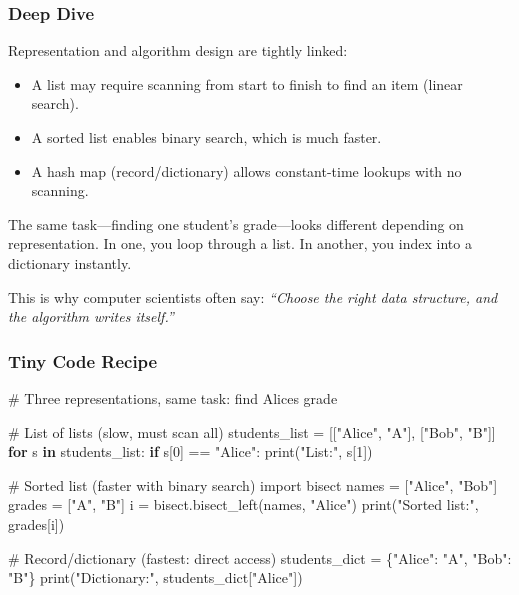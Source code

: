 \documentclass[
  letterpaper,
  DIV=11,
  numbers=noendperiod]{scrreprt}
\newenvironment{Shaded}{\begin{snugshade}}{\end{snugshade}}
\newcommand{\BuiltInTok}[1]{\textcolor[rgb]{0.00,0.23,0.31}{#1}}
\newcommand{\CommentTok}[1]{\textcolor[rgb]{0.37,0.37,0.37}{#1}}
\newcommand{\ControlFlowTok}[1]{\textcolor[rgb]{0.00,0.23,0.31}{\textbf{#1}}}
\newcommand{\DecValTok}[1]{\textcolor[rgb]{0.68,0.00,0.00}{#1}}
\newcommand{\ImportTok}[1]{\textcolor[rgb]{0.00,0.46,0.62}{#1}}
\newcommand{\KeywordTok}[1]{\textcolor[rgb]{0.00,0.23,0.31}{\textbf{#1}}}
\newcommand{\NormalTok}[1]{\textcolor[rgb]{0.00,0.23,0.31}{#1}}
\newcommand{\OperatorTok}[1]{\textcolor[rgb]{0.37,0.37,0.37}{#1}}
\newcommand{\StringTok}[1]{\textcolor[rgb]{0.13,0.47,0.30}{#1}}
\providecommand{\tightlist}{%
  \setlength{\itemsep}{0pt}\setlength{\parskip}{0pt}}
\begin{document}
\subsubsection{Deep Dive}\label{deep-dive-27}

Representation and algorithm design are tightly linked:

\begin{itemize}
\tightlist
\item
  A list may require scanning from start to finish to find an item
  (linear search).
\item
  A sorted list enables binary search, which is much faster.
\item
  A hash map (record/dictionary) allows constant-time lookups with no
  scanning.
\end{itemize}

The same task---finding one student's grade---looks different depending
on representation. In one, you loop through a list. In another, you
index into a dictionary instantly.

This is why computer scientists often say: \emph{``Choose the right data
structure, and the algorithm writes itself.''}

\subsubsection{Tiny Code Recipe}\label{tiny-code-recipe-55}

\begin{Shaded}
\begin{Highlighting}[]
\CommentTok{\# Three representations, same task: find Alice\textquotesingle{}s grade}

\CommentTok{\# List of lists (slow, must scan all)}
\NormalTok{students\_list }\OperatorTok{=}\NormalTok{ [[}\StringTok{"Alice"}\NormalTok{, }\StringTok{"A"}\NormalTok{], [}\StringTok{"Bob"}\NormalTok{, }\StringTok{"B"}\NormalTok{]]}
\ControlFlowTok{for}\NormalTok{ s }\KeywordTok{in}\NormalTok{ students\_list:}
    \ControlFlowTok{if}\NormalTok{ s[}\DecValTok{0}\NormalTok{] }\OperatorTok{==} \StringTok{"Alice"}\NormalTok{:}
        \BuiltInTok{print}\NormalTok{(}\StringTok{"List:"}\NormalTok{, s[}\DecValTok{1}\NormalTok{])}

\CommentTok{\# Sorted list (faster with binary search)}
\ImportTok{import}\NormalTok{ bisect}
\NormalTok{names }\OperatorTok{=}\NormalTok{ [}\StringTok{"Alice"}\NormalTok{, }\StringTok{"Bob"}\NormalTok{]}
\NormalTok{grades }\OperatorTok{=}\NormalTok{ [}\StringTok{"A"}\NormalTok{, }\StringTok{"B"}\NormalTok{]}
\NormalTok{i }\OperatorTok{=}\NormalTok{ bisect.bisect\_left(names, }\StringTok{"Alice"}\NormalTok{)}
\BuiltInTok{print}\NormalTok{(}\StringTok{"Sorted list:"}\NormalTok{, grades[i])}

\CommentTok{\# Record/dictionary (fastest: direct access)}
\NormalTok{students\_dict }\OperatorTok{=}\NormalTok{ \{}\StringTok{"Alice"}\NormalTok{: }\StringTok{"A"}\NormalTok{, }\StringTok{"Bob"}\NormalTok{: }\StringTok{"B"}\NormalTok{\}}
\BuiltInTok{print}\NormalTok{(}\StringTok{"Dictionary:"}\NormalTok{, students\_dict[}\StringTok{"Alice"}\NormalTok{])}
\end{Highlighting}
\end{Shaded}
\end{document}
